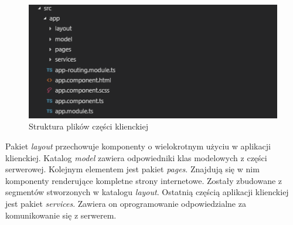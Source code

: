 \documentclass[12pt, twoside]{report}
\begin{document}
\begin{figure}[!ht]
\centering
\includegraphics[scale=1.0, keepaspectratio]{client_structure.png}
\caption{Struktura plików części klienckiej}
\label{fig:client_structuresearch_module}
\end{figure}
\noindent Pakiet \textit{layout} przechowuje komponenty o wielokrotnym użyciu w aplikacji klienckiej. Katalog \textit{model} zawiera odpowiedniki klas modelowych z części serwerowej. Kolejnym elementem jest pakiet \textit{pages}. Znajdują się w nim komponenty renderujące kompletne strony internetowe. Zostały zbudowane z segmentów stworzonych w katalogu \textit{layout}. Ostatnią częścią aplikacji klienckiej jest pakiet \textit{services}. Zawiera on oprogramowanie odpowiedzialne za komunikowanie się z serwerem. 
\newpage
\end{document}
